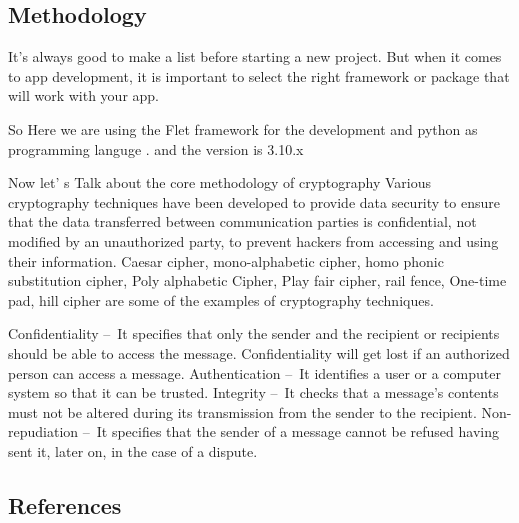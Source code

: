 \documentclass[12pt]{article}
\begin{document}
\newpage
\begin{flushleft}
\section*{\large {Methodology}}
It's always good to make a list before starting a new project. But when it comes to app development, it is important to select the right framework or package that will work with your app.

So Here we are using the Flet  framework for the development and python as programming languge . and the version is 3.10.x 

Now let' s Talk about the core methodology of cryptography 
Various cryptography techniques have been developed to provide data security to ensure that the data transferred between communication parties is confidential, not modified by an unauthorized party, to prevent hackers from accessing and using their information.  Caesar cipher, mono-alphabetic cipher, homo phonic substitution cipher, Poly alphabetic Cipher, Play fair cipher, rail fence, One-time pad, hill cipher are some of the examples of cryptography techniques.


    Confidentiality – It specifies that only the sender and the recipient or recipients should be able to access the message. Confidentiality will get lost if an authorized person can access a message.
    Authentication – It identifies a user or a computer system so that it can be trusted.
    Integrity – It checks that a message’s contents must not be altered during its transmission from the sender to the recipient.
    Non-repudiation – It specifies that the sender of a message cannot be refused having sent it, later on, in the case of a dispute.

\end{flushleft}

\newpage
\renewcommand\refname{\vskip -1cm}
\begin{flushleft}
\section*{\large {References}}


\end{flushleft}

\end{document}
